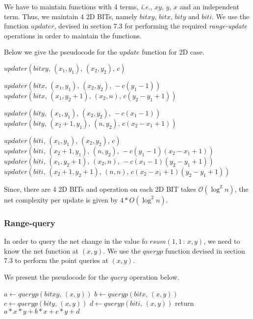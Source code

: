 \documentclass[a4paper]{article}
\begin{document}
We have to maintain functions with 4 terms, \textit{i.e.}, $xy$, $y$, $x$ and an independent term. Thus, we maintain 4 2D BITs, namely $bitxy$, $bitx$, $bity$ and $biti$. We use the function $updater$, devised in section 7.3 for performing the required \textit{range-update} operations in order to maintain the functions.

\vspace{2 mm}
Below we give the pseudocode for the $update$ function for 2D case.

\vspace {3 mm}
\noindent
{}
\begin{algorithmic}[1]

        \State $updater(bitxy,\, (x_1, y_1),\, (x_2,y_2),\, c)$
        
        \State $updater(bitx,\, (x_1, y_1),\, (x_2, y_2),\, -c(y_1-1))$
        \State $updater(bitx,\, (x_1, y_2+1),\, (x_2, n),\, c(y_2-y_1+1))$
        
        \State $updater(bity,\, (x_1, y_1),\, (x_2, y_2),\, -c(x_1-1))$
        \State $updater(bity,\, (x_2+1, y_1),\, (n, y_2),\, c(x_2-x_1+1))$
        
        \State $updater(biti,\, (x_1, y_1),\, (x_2,y_2),\, c)$
        \State $updater(biti,\, (x_2+1, y_1),\, (n, y_2),\, -c(y_1-1)(x_2-x_1+1))$
        \State $updater(biti,\, (x_1, y_2+1),\, (x_2, n),\, -c(x_1-1)(y_2-y_1+1))$
        \State $updater(biti,\, (x_2+1, y_2+1),\, (n, n),\, c(x_2-x_1+1)(y_2-y_1+1))$
\EndFunction
\end{algorithmic}

\vspace{3 mm}
Since, there are 4 2D BITs and operation on each 2D BIT takes $\mathcal{O}(\log^2 n)$, the net complexity per update is given by $4*O(\log^2 n)$.




\subsubsection{Range-query}
In order to query the net change in the value fo $rsum(1, 1\,: \,x, y)$, we need to know the net function at $(x, y)$. We use the $queryp$ function devised in section 7.3 to perform the point queries at $(x, y)$.

\vspace{2 mm}
We present the pseudocode for the $query$ operation below.

\vspace {3 mm}
\noindent
{}
\begin{algorithmic}[1]

        \State $a \gets queryp(bitxy,\, (x, y))$
        \State $b \gets queryp(bitx,\, (x, y))$
        \State $c \gets queryp(bity,\, (x, y))$
        \State $d \gets queryp(biti,\, (x, y))$
        \State return $a*x*y + b*x + c*y + d$
\EndFunction
\end{algorithmic}
\end{document}
